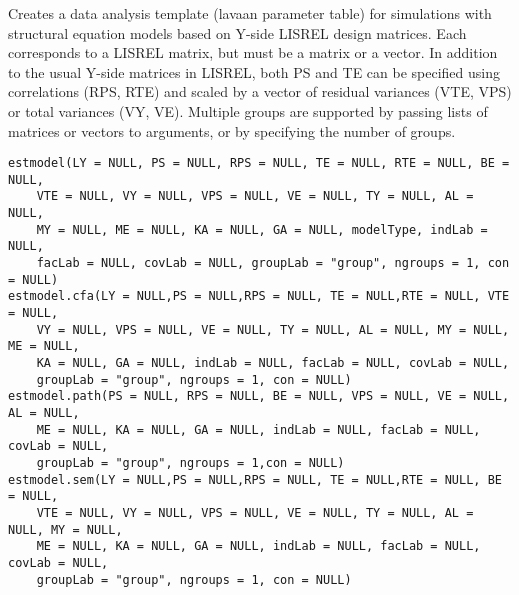 \documentclass[a4paper]{book}
\begin{document}
%
\begin{Description}\relax
Creates a data analysis template (lavaan parameter table) for simulations with structural equation models based on Y-side LISREL design matrices. Each corresponds to a LISREL matrix, but must be a matrix or a vector. In addition to the usual Y-side matrices in LISREL, both PS and TE can be specified using correlations (RPS, RTE) and scaled by a vector of residual variances (VTE, VPS) or total variances (VY, VE). Multiple groups are supported by passing lists of matrices or vectors to arguments, or by specifying the number of groups. 
\end{Description}
%
\begin{Usage}
\begin{verbatim}
estmodel(LY = NULL, PS = NULL, RPS = NULL, TE = NULL, RTE = NULL, BE = NULL, 
	VTE = NULL, VY = NULL, VPS = NULL, VE = NULL, TY = NULL, AL = NULL, 
	MY = NULL, ME = NULL, KA = NULL, GA = NULL, modelType, indLab = NULL, 
	facLab = NULL, covLab = NULL, groupLab = "group", ngroups = 1, con = NULL)
estmodel.cfa(LY = NULL,PS = NULL,RPS = NULL, TE = NULL,RTE = NULL, VTE = NULL, 
	VY = NULL, VPS = NULL, VE = NULL, TY = NULL, AL = NULL, MY = NULL, ME = NULL, 
	KA = NULL, GA = NULL, indLab = NULL, facLab = NULL, covLab = NULL, 
	groupLab = "group", ngroups = 1, con = NULL)
estmodel.path(PS = NULL, RPS = NULL, BE = NULL, VPS = NULL, VE = NULL, AL = NULL, 
	ME = NULL, KA = NULL, GA = NULL, indLab = NULL, facLab = NULL, covLab = NULL, 
	groupLab = "group", ngroups = 1,con = NULL)
estmodel.sem(LY = NULL,PS = NULL,RPS = NULL, TE = NULL,RTE = NULL, BE = NULL, 
	VTE = NULL, VY = NULL, VPS = NULL, VE = NULL, TY = NULL, AL = NULL, MY = NULL, 
	ME = NULL, KA = NULL, GA = NULL, indLab = NULL, facLab = NULL, covLab = NULL, 
	groupLab = "group", ngroups = 1, con = NULL)
\end{verbatim}
\end{Usage}
%
\end{document}
